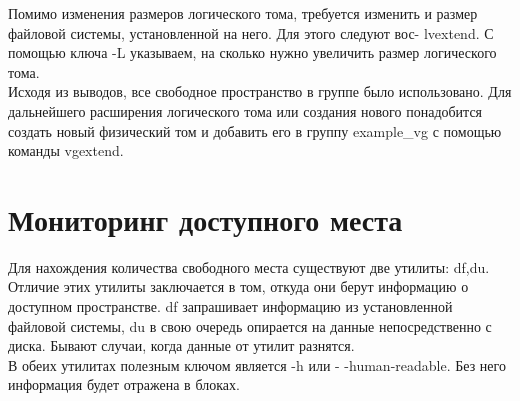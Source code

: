 \documentclass[14pt, a4paper]{article}
\begin{document}
Помимо изменения размеров логического тома, требуется изменить и размер файловой системы,
установленной на него. Для этого следуют вос- 
\colorbox{backcolour}{lvextend}. С помощью ключа -L указываем, на сколько нужно увеличить размер
логического тома.\\

Исходя из выводов, все свободное пространство в группе было использовано. Для дальнейшего
расширения логического тома или создания нового понадобится создать новый физический том и
добавить его в группу example\_vg с помощью команды \colorbox{backcolour}{vgextend}.

\section*{Мониторинг доступного места} 

Для нахождения количества свободного места существуют две утилиты: \colorbox{backcolour}{df,du}. Отличие этих утилиты
заключается в том, откуда они берут информацию о доступном пространстве. \colorbox{backcolour}{df} запрашивает
информацию из установленной файловой системы, \colorbox{backcolour}{du} в свою очередь опирается на данные
непосредственно с диска. Бывают случаи, когда данные от утилит разнятся.\\

В обеих утилитах полезным ключом является -h или - -human-readable. Без него информация будет
отражена в блоках.
\vspace{0.3cm}
\end{document}
